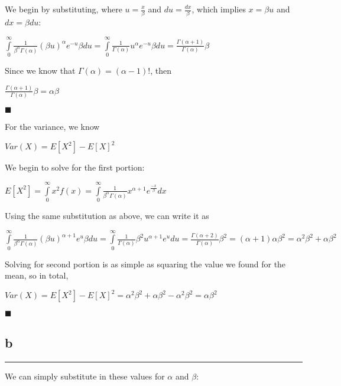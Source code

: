 \documentclass[]{tufte-handout}
\begin{document}
We begin by substituting, where \(u = \frac{x}{\beta}\) and
\(du = \frac{dx}{\beta}\), which implies \(x = \beta u\) and
\(dx = \beta du\):

\(\int\limits_0^\infty \frac{1}{\beta^\alpha\Gamma(\alpha)}(\beta u)^\alpha e^{-u}\beta du = \int\limits_0^\infty \frac{1}{\Gamma(\alpha)}u^\alpha e^{-u}\beta du = \frac{\Gamma(\alpha+1)}{\Gamma(\alpha)}\beta\)

Since we know that \(\Gamma(\alpha) = (\alpha-1)!\), then

\(\frac{\Gamma(\alpha+1)}{\Gamma(\alpha)}\beta = \alpha\beta\)

\begin{marginfigure}
\(\blacksquare\)
\end{marginfigure}

For the variance, we know

\(Var(X) = E[X^2] - E[X]^2\)

We begin to solve for the first portion:

\(E[X^2] = \int \limits _0^\infty x^2f(x) = \int\limits_0^\infty \frac{1}{\beta^\alpha\Gamma(\alpha)}x^{\alpha+1} e^{\frac{-x}{\beta}}dx\)

Using the same substitution as above, we can write it as

\(\int\limits_0^\infty \frac{1}{\beta^\alpha\Gamma(\alpha)}(\beta u)^{\alpha+1} e^u \beta du = \int\limits_0^\infty \frac{1}{\Gamma(\alpha)}\beta^2u^{\alpha+1} e^udu = \frac{\Gamma(\alpha+2)}{\Gamma(\alpha)}\beta^2 = (\alpha + 1)\alpha\beta^2 = \alpha^2\beta^2 + \alpha\beta^2\)

Solving for second portion is as simple as squaring the value we found
for the mean, so in total,

\(Var(X) = E[X^2] - E[X]^2 = \alpha^2\beta^2 + \alpha\beta^2 - \alpha^2\beta^2 = \alpha\beta^2\)

\begin{marginfigure}
\(\blacksquare\)
\end{marginfigure}

\hypertarget{b-3}{%
\subsection{b}\label{b-3}}

\begin{center}\rule{0.5\linewidth}{0.5pt}\end{center}

We can simply substitute in these values for \(\alpha\) and \(\beta\):
\end{document}
